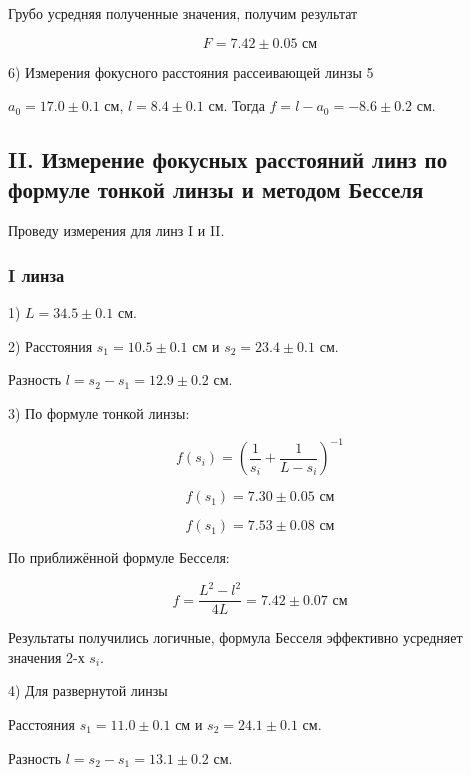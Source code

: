 \documentclass{astroedu-lab}
\begin{document}
\begin{problem}
Грубо усредняя полученные значения, получим результат

\begin{equation}
	F = 7.42 \pm 0.05 \text{ см}
\end{equation}

6) Измерения фокусного расстояния рассеивающей линзы 5 

$a_0 = 17.0 \pm 0.1$ см, $l = 8.4 \pm 0.1$ см. Тогда $f = l - a_0 = -8.6 \pm 0.2$ см.

\subsection{II. Измерение фокусных расстояний линз по формуле тонкой линзы и методом Бесселя}

Проведу измерения для линз I и II.

\subsubsection{I линза}

1) $L = 34.5 \pm 0.1$ см.

2) Расстояния $s_1 = 10.5 \pm 0.1$ см и $s_2 = 23.4 \pm 0.1$ см.

Разность $l = s_2 - s_1 = 12.9 \pm 0.2$ см.

3) По формуле тонкой линзы:

\begin{equation}
	f(s_i) = \left( \frac{1}{s_i} + \frac{1}{L-s_i} \right) ^{-1}
\end{equation}

\begin{equation}
	f(s_1) = 7.30 \pm 0.05 \text{ см}
\end{equation}

\begin{equation}
	f(s_1) = 7.53 \pm 0.08 \text{ см}
\end{equation}

По приближённой формуле Бесселя:

\begin{equation}
	f = \frac{L^2 - l^2}{4 L} = 7.42 \pm 0.07 \text{ см}
\end{equation}

Результаты получились логичные, формула Бесселя эффективно усредняет значения 2-х $s_i$. 

4) Для развернутой линзы

Расстояния $s_1 = 11.0 \pm 0.1$ см и $s_2 = 24.1 \pm 0.1$ см.

Разность $l = s_2 - s_1 = 13.1 \pm 0.2$ см.


\end{problem}
\end{document}
